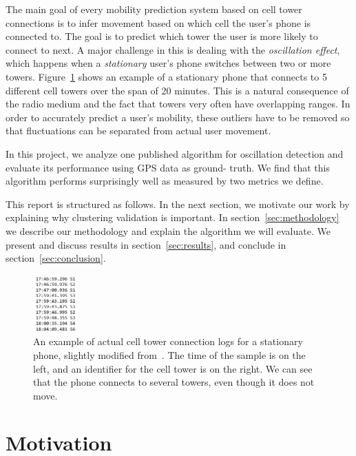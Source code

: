 \documentclass[letterpaper, 12pt, conference]{ieeeconf}
\begin{document}
The main goal of every mobility prediction system based on cell tower connections 
is to infer movement based on which cell the user's phone is connected to. 
The goal
is to predict which tower the user is more likely to connect to next. A major 
challenge in this is dealing with the \textit{oscillation effect}, which 
happens when a \textit{stationary} user's phone switches between two or more 
towers. Figure~\ref{fig:stationary} shows an example of a stationary phone 
that connects to 5 different cell towers over the span of 20 minutes. This is a natural consequence of the 
radio medium and the fact that towers very often have overlapping ranges. In 
order to accurately predict a user's mobility, these outliers have to be 
removed so that fluctuations can be separated from actual user movement.

In this project, we analyze one published algorithm for oscillation detection 
\cite{mobilityprofiler} and evaluate its performance using GPS data as ground-
truth. We find that this algorithm performs surprisingly well as measured by 
two metrics we define.

This report is structured as follows. In the next section, we motivate our 
work by explaining why clustering validation is important.
In section~\ref{sec:methodology} we describe our methodology  and explain the algorithm we 
will evaluate. We present and discuss results in section~\ref{sec:results}, 
and conclude in section~\ref{sec:conclusion}.

\begin{figure}
\centering
\includegraphics[width=0.15\textwidth]{figs/stationary_oscillation}
\caption{An example of actual cell tower connection logs for a stationary 
phone, slightly modified from~\cite{LeapGraph}. The time of the sample is on 
the left, and an identifier for the cell tower is on the right. We can see 
that the phone connects to several towers, even though it does not move. }
\label{fig:stationary}
\end{figure}

\section{Motivation}
\end{document}

